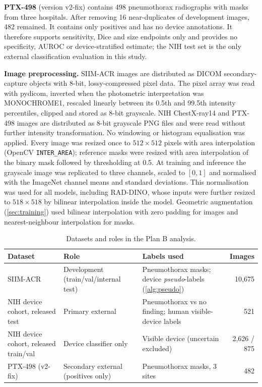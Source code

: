 \documentclass{ieeeaccess}
\begin{document}
\textbf{PTX-498} \cite{wang2021ptx498,wang2021deepsdm} (version v2-fix) contains 498 pneumothorax radiographs with masks from three hospitals. After removing 16 near-duplicates of development images, 482 remained. It contains only positives and has no device annotations. It therefore supports sensitivity, Dice and size endpoints only and provides no specificity, AUROC or device-stratified estimate; the NIH test set is the only external classification evaluation in this study.

\textbf{Image preprocessing.} SIIM-ACR images are distributed as DICOM secondary-capture objects with 8-bit, lossy-compressed pixel data. The pixel array was read with pydicom, inverted when the photometric interpretation was MONOCHROME1, rescaled linearly between its 0.5th and 99.5th intensity percentiles, clipped and stored as 8-bit grayscale. NIH ChestX-ray14 and PTX-498 images are distributed as 8-bit grayscale PNG files and were read without further intensity transformation. No windowing or histogram equalisation was applied. Every image was resized once to $512\times512$ pixels with area interpolation (OpenCV \texttt{INTER\_AREA}); reference masks were resized with area interpolation of the binary mask followed by thresholding at 0.5. At training and inference the grayscale image was replicated to three channels, scaled to $[0,1]$ and normalised with the ImageNet channel means and standard deviations. This normalisation was used for all models, including RAD-DINO, whose inputs were further resized to $518\times518$ by bilinear interpolation inside the model. Geometric augmentation (\cref{sec:training}) used bilinear interpolation with zero padding for images and nearest-neighbour interpolation for masks.

\begin{table}[!t]
\centering\small
\caption{Datasets and roles in the Plan B analysis.}
\label{tab:data}
\begin{tabularx}{\linewidth}{@{}l p{3.6cm} X r@{}}
\toprule
Dataset & Role & Labels used & Images \\
\midrule
SIIM-ACR & Development (train/val/internal test) & Pneumothorax masks; device \emph{pseudo}-labels (\cref{alg:pseudo}) & 10{,}675 \\
NIH device cohort, released test & Primary external & Pneumothorax vs no finding; human visible-device labels & 521 \\
NIH device cohort, released train/val & Device classifier only & Visible device (uncertain excluded) & 2{,}626 / 875 \\
PTX-498 (v2-fix) & Secondary external (positives only) & Pneumothorax masks, 3 sites & 482 \\
\bottomrule
\end{tabularx}
\end{table}
\end{document}
